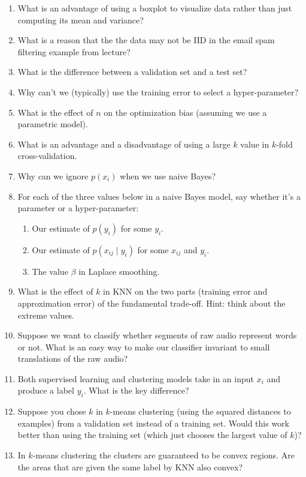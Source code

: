 \documentclass{article}
\def\cond{\; | \;}
\def\enum#1{\begin{enumerate}#1\end{enumerate}}
\begin{document}
\enum{
\item What is an advantage of using a boxplot to visualize data rather than just computing its mean and variance?
\item What is a reason that the the data may not be IID in the email spam filtering example from lecture?
\item What is the difference between a validation set and a test set?
\item Why can't we (typically) use the training error to select a hyper-parameter?
\item What is the effect of $n$ on the optimization bias (assuming we use a parametric model).
\item What is an advantage and a disadvantage of using a large $k$ value in $k$-fold cross-validation.
\item Why can we ignore $p(x_i)$ when we use naive Bayes?
\item For each of the three values below in a naive Bayes model, say whether it's a parameter or a hyper-parameter:
\begin{enumerate}
\item Our estimate of $p(y_i)$ for some $y_i$.
\item Our estimate of $p(x_{ij} \cond y_i)$ for some $x_{ij}$ and $y_i$.
\item The value $\beta$ in Laplace smoothing.
\end{enumerate}
\item What is the effect of $k$ in KNN on the two parts (training error and approximation error) of the fundamental trade-off. Hint: think about the extreme values.
\item Suppose we want to classify whether segments of raw audio represent words or not. What is an easy way to make our classifier invariant to small translations of the raw audio?
\item Both supervised learning and clustering models take in an input $x_i$ and produce a label $y_i$. What is the key difference?
\item Suppose you chose $k$ in $k$-means clustering (using the squared distances to examples) from a validation set instead of a training set. Would this work better than using the training set (which just chooses the largest value of $k$)?
\item In $k$-means clustering the clusters are guaranteed to be convex regions. Are the areas that are given the same label by KNN also convex?
}
\end{document}
